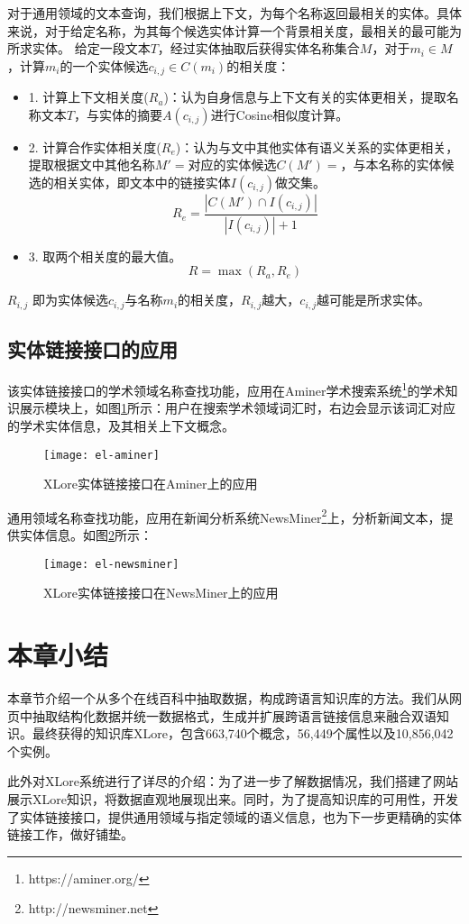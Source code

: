 对于通用领域的文本查询，我们根据上下文，为每个名称返回最相关的实体。具体来说，对于给定名称，为其每个候选实体计算一个背景相关度，最相关的最可能为所求实体。
给定一段文本$T$，经过实体抽取后获得实体名称集合$M$，对于$m_i \in M$，计算$m_i$的一个实体候选$c_{i,j} \in C(m_i)$的相关度：
\begin{itemize}
\item 1.  计算上下文相关度($R_a$)：认为自身信息与上下文有关的实体更相关，提取名称文本$T$，与实体的摘要$A(c_{i,j})$进行Cosine相似度计算。

\item 2.  计算合作实体相关度($R_e$)：认为与文中其他实体有语义关系的实体更相关，提取根据文中其他名称$M'=$对应的实体候选$C(M') = $，与本名称的实体候选的相关实体，即文本中的链接实体$I(c_{i,j})$做交集。
\begin{equation}
{ R }_{ e }=\frac { \left| C\left( M' \right) \cap I\left( { c }_{ i,j } \right)  \right|  }{ \left| I\left( { c }_{ i,j } \right)  \right| +1 } 
\end{equation}

\item 3.  取两个相关度的最大值。
\begin{equation}
R = \max{ \left(R_a, R_e \right)}
\end{equation}
\end{itemize}
$R_{i,j}$ 即为实体候选$c_{i,j}$与名称$m_i$的相关度，$R_{i,j}$越大，$c_{i,j}$越可能是所求实体。

\subsection{实体链接接口的应用}
该实体链接接口的学术领域名称查找功能，应用在Aminer学术搜索系统\footnote{https://aminer.org/}的学术知识展示模块上，如图\ref{fig:el-aminer}所示：用户在搜索学术领域词汇时，右边会显示该词汇对应的学术实体信息，及其相关上下文概念。
\begin{figure}[H] 
  \centering
  \texttt{[image: el-aminer]}
  \caption{XLore实体链接接口在Aminer上的应用}
  \label{fig:el-aminer}
\end{figure}

通用领域名称查找功能，应用在新闻分析系统NewsMiner\footnote{http://newsminer.net}上，分析新闻文本，提供实体信息。如图\ref{fig:el-newsminer}所示：
\begin{figure}[H] 
  \centering
  \texttt{[image: el-newsminer]}
  \caption{XLore实体链接接口在NewsMiner上的应用}
  \label{fig:el-newsminer}
\end{figure}

\section{本章小结}
本章节介绍一个从多个在线百科中抽取数据，构成跨语言知识库的方法。我们从网页中抽取结构化数据并统一数据格式，生成并扩展跨语言链接信息来融合双语知识。最终获得的知识库XLore，包含663,740个概念，56,449个属性以及10,856,042个实例。

此外对XLore系统进行了详尽的介绍：为了进一步了解数据情况，我们搭建了网站展示XLore知识，将数据直观地展现出来。同时，为了提高知识库的可用性，开发了实体链接接口，提供通用领域与指定领域的语义信息，也为下一步更精确的实体链接工作，做好铺垫。

